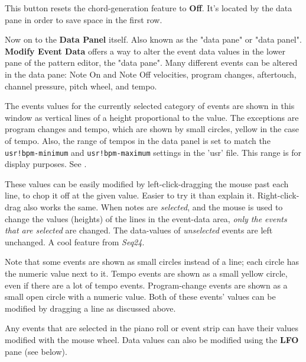    This button resets the chord-generation feature to \textbf{Off}.
   It's located by the data pane in order to save space in the first row.

   Now on to the \textbf{Data Panel} itself.
   Also known as the "data pane"
   or "data panel".
   \textbf{Modify Event Data} offers a way to
   alter the event data values in 
   the lower pane of the pattern editor, the "data pane".
   Many different events can be altered in the data pane:
   Note On and Note Off velocities, program changes, aftertouch, channel
   pressure, pitch wheel, and tempo.

   The events values for the currently selected category of events are shown
   in this window as vertical lines of a height proportional to the value.
   The exceptions are program changes and tempo, which are shown by small
   circles, yellow in the case of tempo.
   Also, the range of tempos in the data panel is set to match the
   \texttt{usr!bpm-minimum}
   and
   \texttt{usr!bpm-maximum}
   settings in the 'usr' file.
   This range is for display purposes.
   See .

   These values can be easily modified by
   left-click-dragging the
   mouse past each line, to chop it off at the given value.  Easier to try
   it than explain it.
   Right-click-drag also works the same.
   When notes are \textsl{selected}, and the
   mouse is used to change the values (heights) of the lines in the event-data
   area, \textsl{only the events that are selected} are changed.
   The data-values of \textsl{unselected} events are left unchanged.
   A cool feature from \textsl{Seq24}.

   Note that some events are shown as small circles instead of a line; each
   circle has the numeric value next to it.
   Tempo events are shown as a small yellow circle, even if there are a lot of
   tempo events.
   Program-change events are shown as a small open circle with a numeric value.
   Both of these events' values can be modified by dragging a line as discussed
   above.

   Any events that are selected in the piano roll or event strip can have
   their values modified with the mouse wheel.
   Data values can also be modified using the \textbf{LFO} pane (see below).

